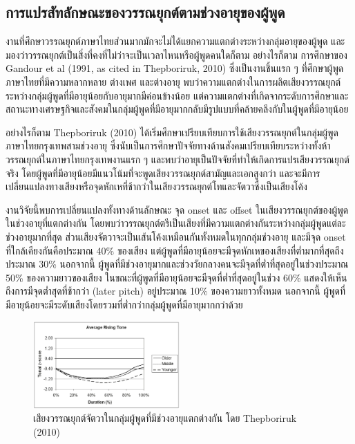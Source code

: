 \documentclass[a4paper]{article}
\begin{document}
\subsection{การแปรสัทลักษณะของวรรณยุกต์ตามช่วงอายุของผู้พูด}
    งานที่ศึกษาวรรณยุกต์ภาษาไทยส่วนมากมักจะไม่ได้แยกความแตกต่างระหว่างกลุ่มอายุของผู้พูด และมองว่าวรรณยุกต์เป็นสิ่งที่คงที่ไม่ว่าจะเป็นเวลาไหนหรือผู้พูดคนใดก็ตาม อย่างไรก็ตาม การศึกษาของ Gandour et al (1991, as cited in Thepboriruk, 2010) ซึ่งเป็นงานชิ้นแรก ๆ ที่ศึกษาผู้พูดภาษาไทยที่มีความหลากหลาย ต่างเพศ และต่างอายุ พบว่าความแตกต่างในการผลิตเสียงวรรณยุกต์ระหว่างกลุ่มผู้พูดที่มีอายุน้อยกับอายุมากมีค่อนข้างน้อย แต่ความแตกต่างที่เกิดจากระดับการศึกษาและสถานะทางเศรษฐกิจและสังคมในกลุ่มผู้พูดที่มีอายุมากกลับมีรูปแบบที่คล้ายคลึงกับในผู้พูดที่มีอายุน้อย

    อย่างไรก็ตาม Thepboriruk (2010) ได้เริ่มศึกษาเปรียบเทียบการใช้เสียงวรรณยุกต์ในกลุ่มผู้พูดภาษาไทยกรุงเทพสามช่วงอายุ ซึ่งนับเป็นการศึกษาปัจจัยทางด้านสังคมเปรียบเทียบระหว่างทั้งห้าวรรณยุกต์ในภาษาไทยกรุงเทพงานแรก ๆ และพบว่าอายุเป็นปัจจัยที่ทำให้เกิดการแปรเสียงวรรณยุกต์จริง โดยผู้พูดที่มีอายุน้อยมีแนวโน้มที่จะพูดเสียงวรรณยุกต์สามัญและเอกสูงกว่า และจะมีการเปลี่ยนแปลงทางเสียงหรือจุดหักเหที่ช้ากว่าในเสียงวรรณยุกต์โทและจัตวาซึ่งเป็นเสียงโค้ง

    งานวิจัยนี้พบการเปลี่ยนแปลงทั้งทางด้านลักษณะ จุด onset และ offset ในเสียงวรรณยุกต์ของผู้พูดในช่วงอายุที่แตกต่างกัน โดยพบว่าวรรณยุกต์ตรีเป็นเสียงที่มีความแตกต่างกันระหว่างกลุ่มผู้พูดแต่ละช่วงอายุมากที่สุด ส่วนเสียงจัตวาจะเป็นเส้นโค้งเหมือนกันทั้งหมดในทุกกลุ่มช่วงอายุ และมีจุด onset ที่ใกล้เคียงกันคือประมาณ 40\% ของเสียง แต่ผู้พูดที่มีอายุน้อยจะมีจุดหักเหของเสียงที่ต่ำมากที่สุดถึงประมาณ 30\% นอกจากนี้ ผู้พูดที่มีช่วงอายุมากและช่วงวัยกลางคนจะมีจุดที่ต่ำที่สุดอยู่ในช่วงประมาณ 50\% ของความยาวของเสียง ในขณะที่ผู้พูดที่มีอายุน้อยจะมีจุดที่ต่ำที่สุดอยู่ในช่วง 60\% แสดงให้เห็นถึงการมีจุดต่ำสุดที่ช้ากว่า (later pitch) อยู่ประมาณ 10\% ของความยาวทั้งหมด นอกจากนี้ ผู้พูดที่มีอายุน้อยจะมีระดับเสียงโดยรวมที่ต่ำกว่ากลุ่มผู้พูดที่มีอายุมากกว่าด้วย
    \begin{figure}[!ht]
        \begin{center}
        \includegraphics[width=0.5\textwidth]{thepboriruk}
        \end{center}
        \caption{เสียงวรรณยุกต์จัตวาในกลุ่มผู้พูดที่มีช่วงอายุแตกต่างกัน โดย Thepboriruk (2010)}
    \end{figure}
\end{document}
